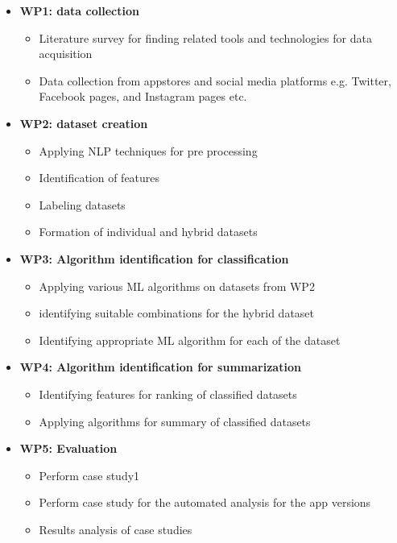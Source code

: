 \begin{itemize}
\item{\textbf{WP1: data collection}}
\begin{itemize}
\item{Literature survey for finding related tools and technologies for data acquisition}
\item{Data collection from appstores and social media platforms e.g. Twitter, Facebook pages, and Instagram pages etc.\\}
\end{itemize}

\item{\textbf{WP2: dataset creation}}
\begin{itemize}
\item{Applying NLP techniques for pre processing}
\item{Identification of features}
\item{Labeling datasets}
\item{Formation of individual and hybrid datasets\\}
\end{itemize}

\item{\textbf{WP3: Algorithm identification for classification}}
\begin{itemize}
\item{Applying various ML algorithms on datasets from WP2}
\item{identifying suitable combinations for the hybrid dataset}
\item{Identifying appropriate ML algorithm for each of the dataset\\}
\end{itemize}

\item{\textbf{WP4: Algorithm identification for summarization}}
\begin{itemize}\item{ Identifying features for ranking of classified datasets}
\item{ Applying algorithms for summary of classified datasets\\}
\end{itemize}

\item{\textbf{WP5: Evaluation}}
\begin{itemize}
\item{Perform case study1}
\item{Perform case study for the automated analysis for the app versions}
\item{Results analysis of case studies\\}
\end{itemize}


\end{itemize}

